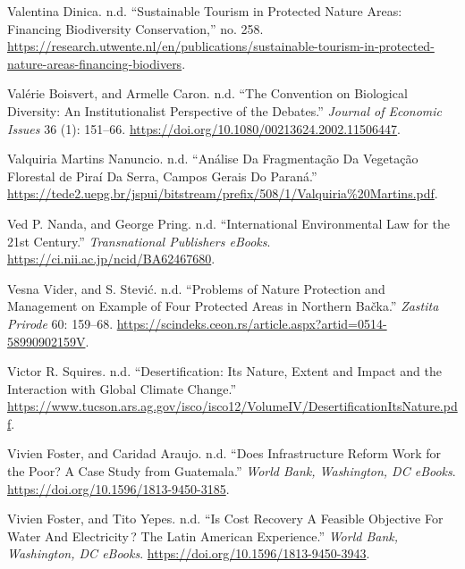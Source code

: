 \begin{CSLReferences}{1}{0}
Valentina Dinica. n.d. {``Sustainable Tourism in Protected Nature Areas:
Financing Biodiversity Conservation,''} no. 258.
\url{https://research.utwente.nl/en/publications/sustainable-tourism-in-protected-nature-areas-financing-biodivers}.

Valérie Boisvert, and Armelle Caron. n.d. {``The Convention on
Biological Diversity: An Institutionalist Perspective of the Debates.''}
\emph{Journal of Economic Issues} 36 (1): 151--66.
\url{https://doi.org/10.1080/00213624.2002.11506447}.

Valquiria Martins Nanuncio. n.d. {``Análise Da Fragmentação Da Vegetação
Florestal de Piraí Da Serra, Campos Gerais Do Paraná.''}
\url{https://tede2.uepg.br/jspui/bitstream/prefix/508/1/Valquiria\%20Martins.pdf}.

Ved P. Nanda, and George Pring. n.d. {``International Environmental Law
for the 21st Century.''} \emph{Transnational Publishers eBooks}.
\url{https://ci.nii.ac.jp/ncid/BA62467680}.

Vesna Vider, and S. Stević. n.d. {``Problems of Nature Protection and
Management on Example of Four Protected Areas in Northern Bačka.''}
\emph{Zastita Prirode} 60: 159--68.
\url{https://scindeks.ceon.rs/article.aspx?artid=0514-58990902159V}.

Victor R. Squires. n.d. {``Desertification: Its Nature, Extent and
Impact and the Interaction with Global Climate Change.''}
\url{https://www.tucson.ars.ag.gov/isco/isco12/VolumeIV/DesertificationItsNature.pdf}.

Vivien Foster, and Caridad Araujo. n.d. {``Does Infrastructure Reform
Work for the Poor? A Case Study from Guatemala.''} \emph{World Bank,
Washington, DC eBooks}. \url{https://doi.org/10.1596/1813-9450-3185}.

Vivien Foster, and Tito Yepes. n.d. {``Is Cost Recovery A Feasible
Objective For Water And Electricity\,? The Latin American Experience.''}
\emph{World Bank, Washington, DC eBooks}.
\url{https://doi.org/10.1596/1813-9450-3943}.


\end{CSLReferences}
